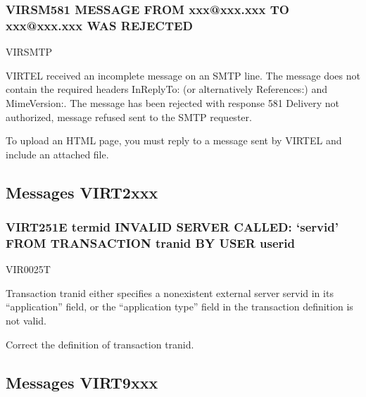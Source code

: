 \documentclass[letterpaper,10pt,english]{sphinxmanual}
\begin{document}
\subsubsection{VIRSM581 MESSAGE FROM xxx@xxx.xxx TO xxx@xxx.xxx WAS REJECTED}
\label{\detokenize{messages:virsm581-message-from-xxx-xxx-xxx-to-xxx-xxx-xxx-was-rejected}}\begin{description}
\sphinxAtStartPar
VIRSMTP

\sphinxAtStartPar
VIRTEL received an incomplete message on an SMTP line. The message does not contain the required headers In\sphinxhyphen{}Reply\sphinxhyphen{}To: (or alternatively References:) and Mime\sphinxhyphen{}Version:. The message has been rejected with response 581 Delivery not authorized, message refused sent to the SMTP requester.

\sphinxAtStartPar
To upload an HTML page, you must reply to a message sent by VIRTEL and include an attached file.

\end{description}


\subsection{Messages VIRT2xxx}
\label{\detokenize{messages:messages-virt2xxx}}

\subsubsection{VIRT251E termid INVALID SERVER CALLED: ‘servid’ FROM TRANSACTION tranid BY USER userid}
\label{\detokenize{messages:virt251e-termid-invalid-server-called-servid-from-transaction-tranid-by-user-userid}}\begin{description}
\sphinxAtStartPar
VIR0025T

\sphinxAtStartPar
Transaction tranid either specifies a non\sphinxhyphen{}existent external server servid in its “application” field, or the “application type” field in the transaction definition is not valid.

\sphinxAtStartPar
Correct the definition of transaction tranid.

\end{description}


\subsection{Messages VIRT9xxx}
\label{\detokenize{messages:messages-virt9xxx}}
\end{document}
